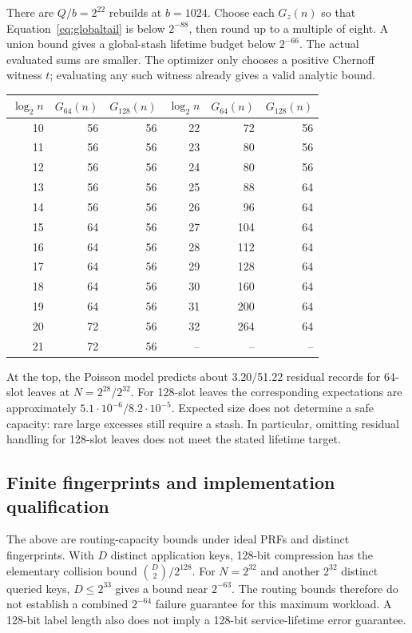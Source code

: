 \documentclass[11pt]{article}
\begin{document}
There are $Q/b=2^{22}$ rebuilds at $b=1024$. Choose each $G_z(n)$ so that
Equation~\eqref{eq:globaltail} is below $2^{-88}$, then round up to a
multiple of eight. A union bound gives a global-stash lifetime budget
below $2^{-66}$. The actual evaluated sums are smaller. The optimizer
only chooses a positive Chernoff witness $t$; evaluating any such witness
already gives a valid analytic bound.
\begin{center}\small
\begin{tabular}{rrrrrr}\toprule
$\log_2 n$ & $G_{64}(n)$ & $G_{128}(n)$ & $\log_2 n$ & $G_{64}(n)$ & $G_{128}(n)$\\\midrule
10 & 56 & 56 & 22 & 72 & 56\\
11 & 56 & 56 & 23 & 80 & 56\\
12 & 56 & 56 & 24 & 80 & 56\\
13 & 56 & 56 & 25 & 88 & 64\\
14 & 56 & 56 & 26 & 96 & 64\\
15 & 64 & 56 & 27 & 104 & 64\\
16 & 64 & 56 & 28 & 112 & 64\\
17 & 64 & 56 & 29 & 128 & 64\\
18 & 64 & 56 & 30 & 160 & 64\\
19 & 64 & 56 & 31 & 200 & 64\\
20 & 72 & 56 & 32 & 264 & 64\\
21 & 72 & 56 & -- & -- & --\\
\bottomrule\end{tabular}\end{center}

At the top, the Poisson model predicts about 3.20/51.22 residual records
for 64-slot leaves at $N=2^{28}/2^{32}$. For 128-slot leaves the corresponding
expectations are approximately $5.1\cdot10^{-6}/8.2\cdot10^{-5}$. Expected
size does not determine a safe capacity: rare large excesses still require
a stash. In particular, omitting residual handling for 128-slot leaves
does not meet the stated lifetime target.

\subsection{Finite fingerprints and implementation qualification}
The above are routing-capacity bounds under ideal PRFs and distinct
fingerprints. With $D$ distinct application keys, 128-bit compression has
the elementary collision bound $\binom D2/2^{128}$. For $N=2^{32}$ and
another $2^{32}$ distinct queried keys, $D\le2^{33}$ gives a bound near
$2^{-63}$. The routing bounds therefore do not establish a combined
$2^{-64}$ failure guarantee for this maximum workload. A 128-bit label
length also does not imply a 128-bit service-lifetime error guarantee.
\end{document}
